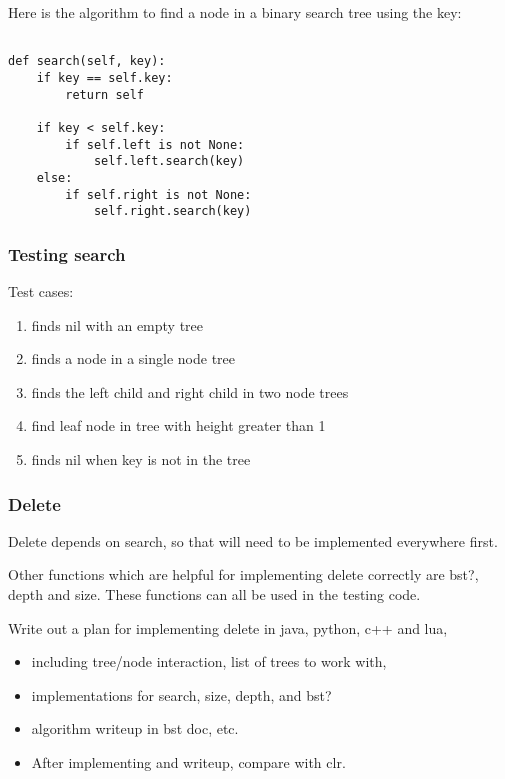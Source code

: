 \documentclass{article}
\begin{document}
Here is the algorithm to find a node in a binary search tree using the key:

\begin{lstlisting}[frame=single]

def search(self, key):
    if key == self.key:
        return self

    if key < self.key:
        if self.left is not None:
            self.left.search(key)
    else:
        if self.right is not None:
            self.right.search(key)
\end{lstlisting}

\subsubsection{Testing search}

Test cases:
\begin{enumerate}
\item finds nil with an empty tree
\item finds a node in a single node tree
\item finds the left child and right child in two node trees
\item find leaf node in tree with height greater than 1
\item finds nil when key is not in the tree
\end{enumerate}

\subsubsection{Delete}

Delete depends on search, so that will need to be implemented everywhere first.

Other functions which are helpful for implementing delete correctly
are bst?, depth and size. These functions can all be used in the testing
code.

Write out a plan for implementing delete in java, python, c++ and lua,

\begin{itemize}
  \item including tree/node interaction, list of trees to work with,
  \item implementations for search, size, depth, and bst?
  \item algorithm writeup in bst doc, etc.
  \item After implementing and writeup, compare with clr.
\end{itemize}
\end{document}
